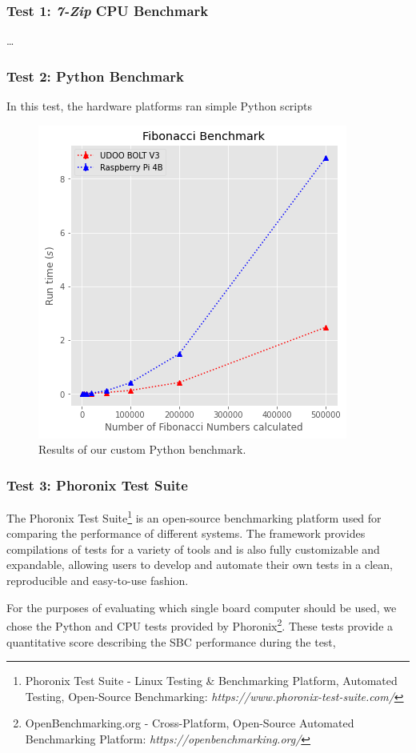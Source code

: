 \subsubsection{Test 1: \textit{7-Zip} CPU Benchmark}
\dots

\subsubsection{Test 2: Python Benchmark}
In this test, the hardware platforms ran simple Python scripts 

\begin{figure}[H]
    \centering
    \includegraphics[width=0.6 \linewidth]{images/fibonacci-test.png}
    \caption{Results of our custom Python benchmark. }
    \label{fig:fibonacci-tests}
\end{figure}

\subsubsection{Test 3: Phoronix Test Suite}
The Phoronix Test Suite\footnote{Phoronix Test Suite - Linux Testing \& Benchmarking Platform, Automated Testing, Open-Source Benchmarking: \textit{https://www.phoronix-test-suite.com/}} is an open-source benchmarking platform used for comparing the performance of different systems. The framework provides compilations of tests for a variety of tools and is also fully customizable and expandable, allowing users to develop and automate their own tests in a clean, reproducible and easy-to-use fashion.  

For the purposes of evaluating which single board computer should be used, we chose the Python and CPU tests provided by Phoronix\footnote{OpenBenchmarking.org - Cross-Platform, Open-Source Automated Benchmarking Platform: \textit{https://openbenchmarking.org/}}. These tests provide a quantitative score describing the \acs{SBC} performance during the test, 


